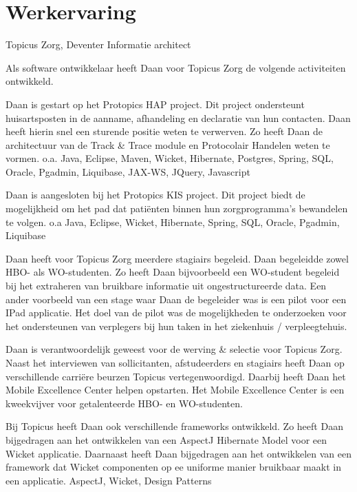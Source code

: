 \section*{Werkervaring}

	\begin{workExperience}{Topicus Zorg, Deventer}%
	{Informatie architect}{}
		
		Als software ontwikkelaar heeft Daan voor Topicus Zorg de volgende
		activiteiten ontwikkeld.
		
		Daan is gestart op het Protopics HAP project. Dit project ondersteunt
		huisartsposten in de aanname, afhandeling en declaratie van hun
		contacten. Daan heeft hierin snel een sturende positie weten te
		verwerven. Zo heeft Daan de architectuur van de Track \& Trace module en
		Protocolair Handelen weten te vormen.
		\technics o.a. Java, Eclipse, Maven, Wicket, Hibernate, Postgres,
		Spring, SQL, Oracle, Pgadmin, Liquibase, JAX-WS, JQuery, Javascript
		
		Daan is aangesloten bij het Protopics KIS project. Dit project biedt
		de mogelijkheid om het pad dat pati\"enten binnen hun zorgprogramma's
		bewandelen te volgen.
		\technics o.a Java, Eclipse, Wicket, Hibernate, Spring, SQL, Oracle,
		Pgadmin, Liquibase
		
		Daan heeft voor Topicus Zorg meerdere stagiairs begeleid.
		Daan begeleidde zowel HBO- als WO-studenten. Zo heeft Daan bijvoorbeeld
		een WO-student begeleid bij het extraheren van bruikbare informatie uit
		ongestructureerde data. Een ander voorbeeld van een stage waar Daan de
		begeleider was is een pilot voor een IPad applicatie. Het doel van de
		pilot was de mogelijkheden te onderzoeken voor het ondersteunen van
		verplegers bij hun taken in het ziekenhuis / verpleegtehuis.
		
		Daan is verantwoordelijk geweest voor de werving \& selectie voor
		Topicus Zorg. Naast het interviewen van sollicitanten, afstudeerders en
		stagiairs heeft Daan op verschillende carri\"ere beurzen Topicus
		vertegenwoordigd.
		Daarbij heeft Daan het Mobile Excellence Center helpen opstarten. Het
		Mobile Excellence Center is een kweekvijver voor getalenteerde HBO- en
		WO-studenten.
		
		Bij Topicus heeft Daan ook verschillende frameworks ontwikkeld. Zo
		heeft Daan bijgedragen aan het ontwikkelen van een AspectJ Hibernate
		Model voor een Wicket applicatie. Daarnaast heeft Daan bijgedragen aan
		het ontwikkelen van een framework dat Wicket componenten op ee uniforme
		manier bruikbaar maakt in een applicatie.
		\technics AspectJ, Wicket, Design Patterns
	\end{workExperience}

